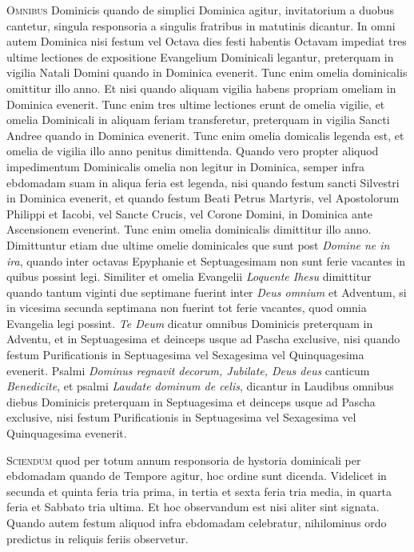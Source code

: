 \begin{multicols*}{2}
{\color{Red} }
\lettrine[lines=2]{\zallmancaps \color{Red} O}{mnibus} Dominicis quando de simplici Dominica agitur, invitatorium a duobus cantetur, singula responsoria a singulis fratribus in matutinis dicantur. In omni autem Dominica nisi festum vel Octava dies festi habentis Octavam impediat tres ultime lectiones de expositione Evangelium Dominicali legantur, preterquam in vigilia Natali Domini quando in Dominica evenerit.
Tunc enim omelia dominicalis omittitur illo anno. Et nisi quando aliquam vigilia habens propriam omeliam in Dominica evenerit. Tunc enim tres ultime lectiones erunt de omelia vigilie, et omelia Dominicali in aliquam feriam transferetur, preterquam in vigilia Sancti Andree quando in Dominica evenerit. Tunc enim omelia domicalis legenda est, et omelia de vigilia illo anno penitus dimittenda.
Quando vero propter aliquod impedimentum Dominicalis omelia non legitur in Dominica, semper infra ebdomadam suam in aliqua feria est legenda, nisi quando festum sancti Silvestri in Dominica evenerit, et quando festum Beati Petrus Martyris, vel Apostolorum Philippi et Iacobi, vel Sancte Crucis, vel Corone Domini, in Dominica ante Ascensionem evenerint. Tunc enim omelia dominicalis dimittitur illo anno. Dimittuntur etiam due ultime omelie dominicales que sunt post \textit{Domine ne in ira}, quando inter octavas Epyphanie et Septuagesimam non sunt ferie vacantes in quibus possint legi. Similiter et omelia Evangelii \textit{Loquente Ihesu} dimittitur quando tantum viginti due septimane fuerint inter \textit{Deus omnium} et Adventum, si in vicesima secunda septimana non fuerint tot ferie vacantes, quod omnia Evangelia legi possint.
\textit{Te Deum} dicatur omnibus Dominicis preterquam in Adventu, et in Septuagesima et deinceps usque ad Pascha exclusive, nisi quando festum Purificationis in Septuagesima vel Sexagesima vel Quinquagesima evenerit.
Psalmi \textit{Dominus regnavit decorum, Jubilate, Deus deus} canticum \textit{Benedicite}, et psalmi \textit{Laudate dominum de celis}, dicantur in Laudibus omnibus diebus Dominicis preterquam in Septuagesima et deinceps usque ad Pascha exclusive, nisi festum Purificationis in Septuagesima vel Sexagesima vel Quinquagesima evenerit.

{\color{Red} }
\lettrine[lines=2]{\zallmancaps \color{Blue} S}{ciendum} quod per totum annum responsoria de hystoria dominicali per ebdomadam quando de Tempore agitur, hoc ordine sunt dicenda. Videlicet in secunda et quinta feria tria prima, in tertia et sexta feria tria media, in quarta feria et Sabbato tria ultima. Et hoc observandum est nisi aliter sint signata. Quando autem festum aliquod infra ebdomadam celebratur, nihilominus ordo predictus in reliquis feriis observetur.


\end{multicols*}
